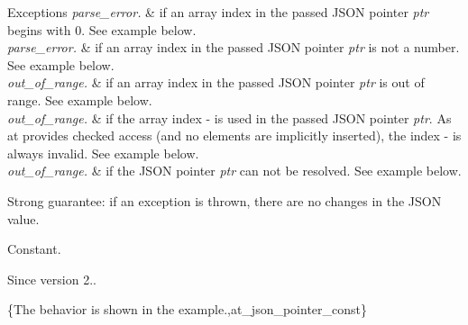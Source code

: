 \begin{DoxyExceptions}{Exceptions}
{\em parse\+\_\+error.} & if an array index in the passed J\+S\+ON pointer {\itshape ptr} begins with \textquotesingle{}0\textquotesingle{}. See example below.\\
\hline
{\em parse\+\_\+error.} & if an array index in the passed J\+S\+ON pointer {\itshape ptr} is not a number. See example below.\\
\hline
{\em out\+\_\+of\+\_\+range.} & if an array index in the passed J\+S\+ON pointer {\itshape ptr} is out of range. See example below.\\
\hline
{\em out\+\_\+of\+\_\+range.} & if the array index \textquotesingle{}-\/\textquotesingle{} is used in the passed J\+S\+ON pointer {\itshape ptr}. As {\ttfamily at} provides checked access (and no elements are implicitly inserted), the index \textquotesingle{}-\/\textquotesingle{} is always invalid. See example below.\\
\hline
{\em out\+\_\+of\+\_\+range.} & if the J\+S\+ON pointer {\itshape ptr} can not be resolved. See example below.\\
\hline
\end{DoxyExceptions}
Strong guarantee\+: if an exception is thrown, there are no changes in the J\+S\+ON value.

Constant.

\begin{DoxySince}{Since}
version 2..
\end{DoxySince}
\{The behavior is shown in the example.,at\+\_\+json\+\_\+pointer\+\_\+const\} \mbox{\label{classnlohmann_1_1basic__json_a011397134847f36db0ed7d7a93753677}} 
